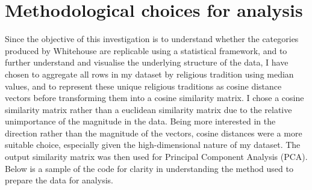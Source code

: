 \documentclass[12pt]{report}
\begin{document}
	\section{Methodological choices for analysis}
	
	Since the objective of this investigation is to understand whether the categories produced by Whitehouse are replicable using a statistical framework, and to further understand and visualise the underlying structure of the data, I have chosen to aggregate all rows in my dataset by religious tradition using median values, and to represent these unique religious traditions as cosine distance vectors before transforming them into a cosine similarity matrix. I chose a cosine similarity matrix rather than a euclidean similarity matrix due to the relative unimportance of the magnitude in the data. Being more interested in the direction rather than the magnitude of the vectors, cosine distances were a more suitable choice, especially given the high-dimensional nature of my dataset. The output similarity matrix was then used for Principal Component Analysis (PCA). Below is a sample of the code for clarity in understanding the method used to prepare the data for analysis.\\
	
\end{document}
